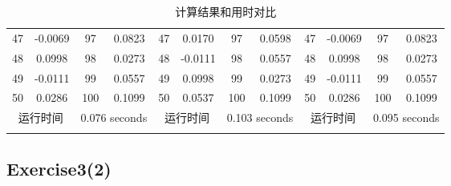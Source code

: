 \documentclass{article}
\begin{document}
\begin{longtable}[c]{cccccccccccc}
	47        & -0.0069      & 97            & 0.0823            & 47       & 0.0170        & 97            & 0.0598            & 47       & -0.0069       & 97            & 0.0823            \\
	48        & 0.0998       & 98            & 0.0273            & 48       & -0.0111       & 98            & 0.0557            & 48       & 0.0998        & 98            & 0.0273            \\
	49        & -0.0111      & 99            & 0.0557            & 49       & 0.0998        & 99            & 0.0273            & 49       & -0.0111       & 99            & 0.0557            \\
	50        & 0.0286       & 100           & 0.1099            & 50       & 0.0537        & 100           & 0.1099            & 50       & 0.0286        & 100           & 0.1099            \\
	\multicolumn{2}{c}{运行时间} & \multicolumn{2}{c}{0.076 seconds} & \multicolumn{2}{c}{运行时间} & \multicolumn{2}{c}{0.103 seconds} & \multicolumn{2}{c}{运行时间} & \multicolumn{2}{c}{0.095 seconds}	\\
	\bottomrule
	\caption{计算结果和用时对比}
	\label{tab:my-table}\\
\end{longtable}

\subsection*{Exercise3(2)}
\end{document}
